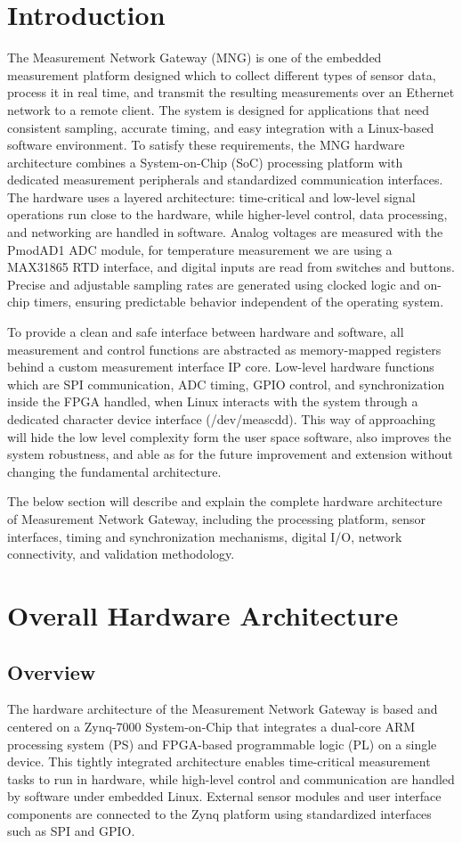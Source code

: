 \section{Introduction}
The Measurement Network Gateway (MNG) is one of the embedded measurement platform designed which to collect different types of sensor data, process it in real time, and transmit the resulting measurements over an Ethernet network to a remote client. The system is designed for applications that need consistent sampling, accurate timing, and easy integration with a Linux-based software environment. To satisfy these requirements, the MNG hardware architecture combines a System-on-Chip (SoC) processing platform with dedicated measurement peripherals and standardized communication interfaces. The hardware uses a layered architecture: time-critical and low-level signal operations run close to the hardware, while higher-level control, data processing, and networking are handled in software. Analog voltages are measured with the PmodAD1 ADC module,  for temperature measurement we are using a MAX31865 RTD interface, and digital inputs are read from switches and buttons. Precise and adjustable sampling rates are generated using clocked logic and on-chip timers, ensuring predictable behavior independent of the operating system.

To provide a clean and safe interface between hardware and software, all measurement and control functions are abstracted as memory-mapped registers behind a custom measurement interface IP core. Low-level hardware functions which are SPI communication, ADC timing, GPIO control, and synchronization inside the FPGA handled, when Linux interacts with the system through a dedicated character device interface (/dev/meascdd). This way of approaching will hide the low level complexity form the user space software, also improves the system robustness, and able as for the future improvement  and extension without changing the fundamental architecture.

The below section will describe and explain the complete hardware architecture of Measurement Network Gateway, including the processing platform, sensor interfaces, timing and synchronization mechanisms, digital I/O, network connectivity, and validation methodology.

\section{Overall Hardware Architecture}
\subsection{Overview}
The hardware architecture of the Measurement Network Gateway is based and centered on a Zynq-7000 System-on-Chip that integrates a dual-core ARM processing system (PS) and FPGA-based programmable logic (PL) on a single device. This tightly integrated architecture enables time-critical measurement tasks to run in hardware, while high-level control and communication are handled by software under embedded Linux. External sensor modules and user interface components are connected to the Zynq platform using standardized interfaces such as SPI and GPIO.

